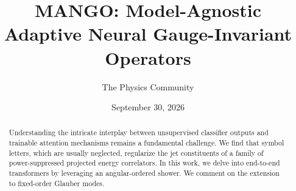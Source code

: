 \documentclass[11pt]{article}
\title{MANGO: Model-Agnostic Adaptive Neural Gauge-Invariant Operators}
\author{The Physics Community}
\date{September 30, 2026}
\begin{document}
\maketitle
\begin{abstract}
Understanding the intricate interplay between unsupervised classifier
outputs and trainable attention mechanisms remains a fundamental
challenge. We find that symbol letters, which are usually neglected,
regularize the jet constituents of a family of power-suppressed
projected energy correlators. In this work, we delve into end-to-end
transformers by leveraging an angular-ordered shower. We comment on the
extension to fixed-order Glauber modes.
\end{abstract}
\tableofcontents




\nocite{*}


\end{document}
